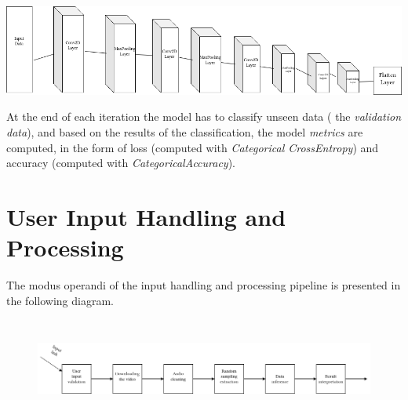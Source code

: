 \begin{center}
	\centering
	\includegraphics[width = 5.5in]{images/conv2d.png}
	\centerline{}
\label{genarch}
\end{center}

At the end of each iteration the model has to classify unseen data ( the \textit{validation data}), and based on the results of
the classification, the model \textit{metrics} are computed, in the form of loss (computed with \textit{Categorical CrossEntropy})
and accuracy (computed with \textit{CategoricalAccuracy}).


\section{User Input Handling and Processing}

The modus operandi of the input handling and processing pipeline is presented in the following diagram.

\begin{figure}[H]
	\centering
	\includegraphics[width = 6.5in,height=1.3in]{images/datapipe.png}
	\centerline{}
\label{mo}
\end{figure}

